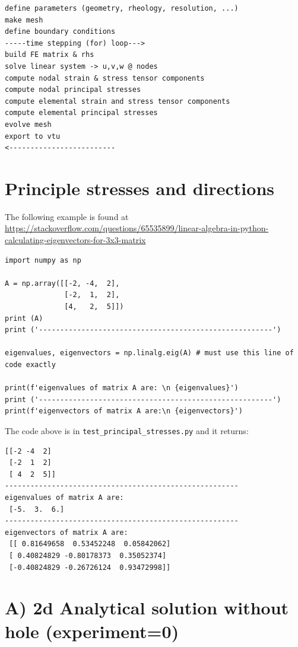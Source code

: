 \begin{verbatim}
define parameters (geometry, rheology, resolution, ...)
make mesh
define boundary conditions
-----time stepping (for) loop--->
build FE matrix & rhs
solve linear system -> u,v,w @ nodes 
compute nodal strain & stress tensor components
compute nodal principal stresses 
compute elemental strain and stress tensor components
compute elemental principal stresses 
evolve mesh
export to vtu 
<-------------------------
\end{verbatim}


\section*{Principle stresses and directions}

The following example is found at \url{https://stackoverflow.com/questions/65535899/linear-algebra-in-python-calculating-eigenvectors-for-3x3-matrix}

\begin{lstlisting}
import numpy as np

A = np.array([[-2, -4,  2],
              [-2,  1,  2],
              [4,   2,  5]])
print (A)
print ('-------------------------------------------------------')

eigenvalues, eigenvectors = np.linalg.eig(A) # must use this line of code exactly 

print(f'eigenvalues of matrix A are: \n {eigenvalues}')
print ('-------------------------------------------------------')
print(f'eigenvectors of matrix A are:\n {eigenvectors}')
\end{lstlisting}

The code above is in {\tt test\_principal\_stresses.py} and 
it returns:
\begin{verbatim}
[[-2 -4  2]
 [-2  1  2]
 [ 4  2  5]]
-------------------------------------------------------
eigenvalues of matrix A are: 
 [-5.  3.  6.]
-------------------------------------------------------
eigenvectors of matrix A are:
 [[ 0.81649658  0.53452248  0.05842062]
 [ 0.40824829 -0.80178373  0.35052374]
 [-0.40824829 -0.26726124  0.93472998]]
\end{verbatim}



\newpage
\section*{A) 2d Analytical solution without hole (experiment=0)}

